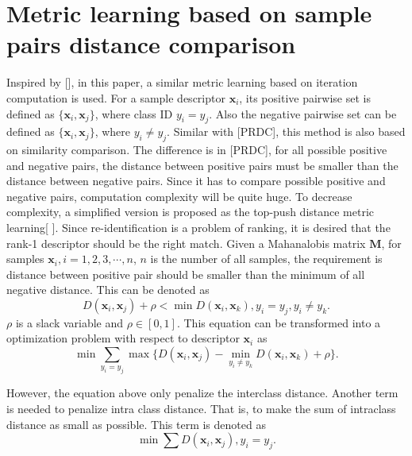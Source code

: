  \section{Metric learning based on sample pairs distance comparison}
 Inspired by [], in this paper, a similar metric learning based on iteration computation is used. For a  sample descriptor $\bm{x}_i$,  its positive pairwise set is defined as $\{\bm{x}_i,\bm{x}_j\}$, where class ID $y_i = y_j$. Also the negative pairwise set can be defined as $\{\bm{x}_i,\bm{x}_j\}$, where $y_i \ne y_j$. Similar with [PRDC], this method is also based on similarity comparison. The difference is in [PRDC], for all possible positive and negative pairs, the distance between positive pairs must be smaller than the distance between negative pairs. Since it has to compare possible positive and negative pairs, computation complexity will be quite huge.  To decrease complexity, a simplified version is proposed as the top-push distance metric learning[ ].  Since re-identification is a problem of ranking, it is desired that the rank-1 descriptor should be the right match. Given a Mahanalobis matrix $\bm{M}$, for samples $\bm{x}_i, i = 1,2,3,\cdots,n$, $n$ is the number of all samples, the requirement is distance between positive pair should be smaller than the minimum of all negative distance. This can be denoted as 
 \begin{equation}
 D(\bm{x}_i,\bm{x}_j) + \rho < \min D(\bm{x}_i,\bm{x}_k), y_i = y_j, y_i\ne y_k.
 \end{equation}
 $\rho$ is a slack variable and $\rho \in [0,1]$. This equation can be transformed into a optimization problem with respect to descriptor $\bm{x}_i$ as
 \begin{equation}
 \min \sum_{y_i = y_j} \max \{D(\bm{x}_i,\bm{x}_j) -  \min_{ y_i\ne y_k} D(\bm{x}_i,\bm{x}_k)  + \rho \}.
 \end{equation}
 
 However, the equation above only penalize the interclass distance. Another term is needed to penalize intra class distance. That is, to make the sum of intraclass distance as small as possible. This term is denoted as 
 \begin{equation}
 \min \sum D(\bm{x}_i,\bm{x}_j),y_i = y_j.
 \end{equation}
 
